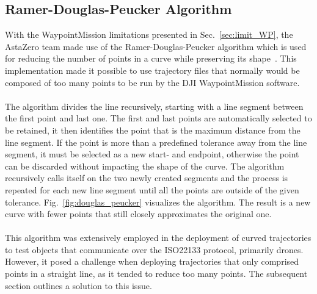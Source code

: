 \subsection{Ramer-Douglas-Peucker Algorithm} \label{douglas_puecker}
With the WaypointMission limitations presented in Sec.~\ref{sec:limit_WP}, the AstaZero team made use of the Ramer-Douglas-Peucker algorithm which is used for reducing the number of points in a curve while preserving its shape~\cite{Douglas1973ALGORITHMSCARICATURE}. This implementation made it possible to use trajectory files that normally would be composed of too many points to be run by the DJI WaypointMission software.  
\\ \\
The algorithm divides the line recursively, starting with a line segment between the first point and last one. The first and last points are automatically selected to be retained, it then identifies the point that is the maximum distance from the line segment. If the point is more than a predefined tolerance away from the line segment, it must be selected as a new start- and endpoint, otherwise the point can be discarded without impacting the shape of the curve. The algorithm recursively calls itself on the two newly created segments and the process is repeated for each new line segment until all the points are outside of the given tolerance. Fig.~\ref{fig:douglas_peucker} visualizes the algorithm. The result is a new curve with fewer points that still closely approximates the original one.
\\ \\
This algorithm was extensively employed in the deployment of curved trajectories to test objects that communicate over the ISO22133 protocol, primarily drones. However, it posed a challenge when deploying trajectories that only comprised points in a straight line, as it tended to reduce too many points. The subsequent section outlines a solution to this issue.

